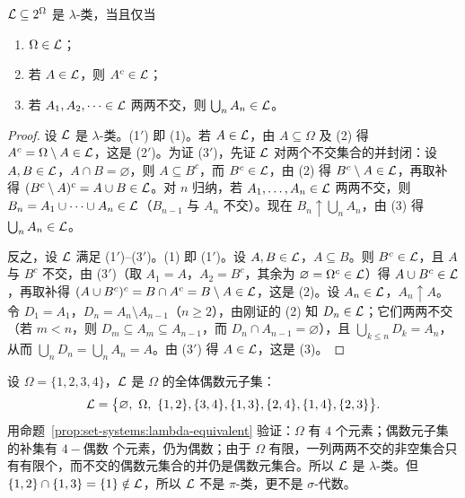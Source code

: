 \begin{proposition}\label{prop:set-systems:lambda-equivalent}
$\mathcal{L}\subseteq2^\Omega$ 是 $\lambda$-类，当且仅当
\begin{enumerate}
\item[(1$'$)] $\Omega\in\mathcal{L}$；
\item[(2$'$)] 若 $A\in\mathcal{L}$，则 $A^c\in\mathcal{L}$；
\item[(3$'$)] 若 $A_1,A_2,\dots\in\mathcal{L}$ 两两不交，则 $\bigcup_nA_n\in\mathcal{L}$。
\end{enumerate}
\end{proposition}
\begin{proof}
设 $\mathcal{L}$ 是 $\lambda$-类。(1$'$) 即 (1)。若 $A\in\mathcal{L}$，由 $A\subseteq\Omega$ 及 (2) 得 $A^c=\Omega\setminus A\in\mathcal{L}$，这是 (2$'$)。为证 (3$'$)，先证 $\mathcal{L}$ 对两个不交集合的并封闭：设 $A,B\in\mathcal{L}$，$A\cap B=\varnothing$，则 $A\subseteq B^c$，而 $B^c\in\mathcal{L}$，由 (2) 得 $B^c\setminus A\in\mathcal{L}$，再取补得 $(B^c\setminus A)^c=A\cup B\in\mathcal{L}$。对 $n$ 归纳，若 $A_1,\dots,A_n\in\mathcal{L}$ 两两不交，则 $B_n=A_1\cup\cdots\cup A_n\in\mathcal{L}$（$B_{n-1}$ 与 $A_n$ 不交）。现在 $B_n\uparrow\bigcup_nA_n$，由 (3) 得 $\bigcup_nA_n\in\mathcal{L}$。

反之，设 $\mathcal{L}$ 满足 (1$'$)–(3$'$)。(1) 即 (1$'$)。设 $A,B\in\mathcal{L}$，$A\subseteq B$。则 $B^c\in\mathcal{L}$，且 $A$ 与 $B^c$ 不交，由 (3$'$)（取 $A_1=A$，$A_2=B^c$，其余为 $\varnothing=\Omega^c\in\mathcal{L}$）得 $A\cup B^c\in\mathcal{L}$，再取补得 $(A\cup B^c)^c=B\cap A^c=B\setminus A\in\mathcal{L}$，这是 (2)。设 $A_n\in\mathcal{L}$，$A_n\uparrow A$。令 $D_1=A_1$，$D_n=A_n\setminus A_{n-1}$（$n\geqslant2$），由刚证的 (2) 知 $D_n\in\mathcal{L}$；它们两两不交（若 $m<n$，则 $D_m\subseteq A_m\subseteq A_{n-1}$，而 $D_n\cap A_{n-1}=\varnothing$），且 $\bigcup_{k\leqslant n}D_k=A_n$，从而 $\bigcup_nD_n=\bigcup_nA_n=A$。由 (3$'$) 得 $A\in\mathcal{L}$，这是 (3)。
\end{proof}

\begin{example}\label{ex:set-systems:even}
设 $\Omega=\{1,2,3,4\}$，$\mathcal{L}$ 是 $\Omega$ 的全体偶数元子集：
\[
\cL=\bigl\{\varnothing,\ \Omega,\ \{1,2\},\{3,4\},\{1,3\},\{2,4\},\{1,4\},\{2,3\}\bigr\}.
\]
用命题~\ref{prop:set-systems:lambda-equivalent} 验证：$\Omega$ 有 $4$ 个元素；偶数元子集的补集有 $4-\text{偶数}$ 个元素，仍为偶数；由于 $\Omega$ 有限，一列两两不交的非空集合只有有限个，而不交的偶数元集合的并仍是偶数元集合。所以 $\mathcal{L}$ 是 $\lambda$-类。但 $\{1,2\}\cap\{1,3\}=\{1\}\notin\mathcal{L}$，所以 $\mathcal{L}$ 不是 $\pi$-类，更不是 $\sigma$-代数。
\end{example}

